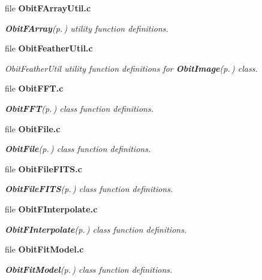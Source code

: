 \begin{CompactItemize}
\item 
file {\bf Obit\-FArray\-Util.c}
\begin{CompactList}\small\item\em {\bf Obit\-FArray}{\rm (p.\,\pageref{structObitFArray})} utility function definitions. \item\end{CompactList}

\item 
file {\bf Obit\-Feather\-Util.c}
\begin{CompactList}\small\item\em Obit\-Feather\-Util utility function definitions for {\bf Obit\-Image}{\rm (p.\,\pageref{structObitImage})} class. \item\end{CompactList}

\item 
file {\bf Obit\-FFT.c}
\begin{CompactList}\small\item\em {\bf Obit\-FFT}{\rm (p.\,\pageref{structObitFFT})} class function definitions. \item\end{CompactList}

\item 
file {\bf Obit\-File.c}
\begin{CompactList}\small\item\em {\bf Obit\-File}{\rm (p.\,\pageref{structObitFile})} class function definitions. \item\end{CompactList}

\item 
file {\bf Obit\-File\-FITS.c}
\begin{CompactList}\small\item\em {\bf Obit\-File\-FITS}{\rm (p.\,\pageref{structObitFileFITS})} class function definitions. \item\end{CompactList}

\item 
file {\bf Obit\-FInterpolate.c}
\begin{CompactList}\small\item\em {\bf Obit\-FInterpolate}{\rm (p.\,\pageref{structObitFInterpolate})} class function definitions. \item\end{CompactList}

\item 
file {\bf Obit\-Fit\-Model.c}
\begin{CompactList}\small\item\em {\bf Obit\-Fit\-Model}{\rm (p.\,\pageref{structObitFitModel})} class function definitions. \item\end{CompactList}


\end{CompactItemize}
